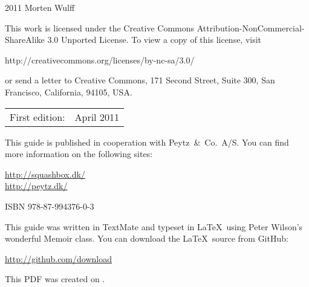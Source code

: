 \begingroup
\footnotesize
\setlength{\parindent}{0pt}
\setlength{\parskip}{\baselineskip}

\textcopyright{} 2011 Morten Wulff

This work is licensed under the Creative Commons Attribution-NonCommercial-ShareAlike 3.0 Unported License. To view a copy of this license, visit

http://creativecommons.org/licenses/by-nc-sa/3.0/

or send a letter to Creative Commons, 171 Second Street, Suite 300, San Francisco, California, 94105, USA.

\begin{center}
\begin{tabular}{ll}
First edition: & April 2011 \\
\end{tabular}
\end{center}

This guide is published in cooperation with Peytz~\&~Co.\ A/S. You can find more information on the following sites:

\url{http://squashbox.dk/} \\
\url{http://peytz.dk/}

\vspace{2\baselineskip}

ISBN 978-87-994376-0-3

\vspace{2\baselineskip}

This guide was written in TextMate and typeset in \LaTeX~using Peter Wilson's wonderful Memoir class. You can download the \LaTeX~source from GitHub:

\url{http://github.com/download}

\vspace{2\baselineskip}

This PDF was created on \thedate.

\endgroup

\thispagestyle{empty}

\clearpage
